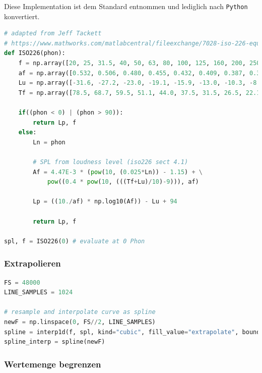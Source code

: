 Diese Implementation ist dem Standard entnommen und lediglich nach
\texttt{Python} konvertiert.

\begin{lstlisting}[language=Python]
# adapted from Jeff Tackett
# https://www.mathworks.com/matlabcentral/fileexchange/7028-iso-226-equal-loudness-level-contour-signal
def ISO226(phon):
    f = np.array([20, 25, 31.5, 40, 50, 63, 80, 100, 125, 160, 200, 250, 315, 400, 500, 630, 800, 1000, 1250, 1600, 2000, 2500, 3150, 4000, 5000, 6300, 8000, 10000, 12500])
    af = np.array([0.532, 0.506, 0.480, 0.455, 0.432, 0.409, 0.387, 0.367, 0.349, 0.330, 0.315, 0.301, 0.288, 0.276, 0.267, 0.259, 0.253, 0.250, 0.246, 0.244, 0.243, 0.243, 0.243, 0.242, 0.242, 0.245, 0.254, 0.271, 0.301])
    Lu = np.array([-31.6, -27.2, -23.0, -19.1, -15.9, -13.0, -10.3, -8.1, -6.2, -4.5, -3.1, -2.0, -1.1, -0.4, 0.0, 0.3, 0.5, 0.0, -2.7, -4.1, -1.0, 1.7, 2.5, 1.2, -2.1, -7.1, -11.2, -10.7, -3.1])
    Tf = np.array([78.5, 68.7, 59.5, 51.1, 44.0, 37.5, 31.5, 26.5, 22.1, 17.9, 14.4, 11.4, 8.6, 6.2, 4.4, 3.0, 2.2, 2.4, 3.5, 1.7, -1.3, -4.2, -6.0, -5.4, -1.5, 6.0, 12.6, 13.9, 12.3])

    if((phon < 0) | (phon > 90)):
        return Lp, f
    else:
        Ln = phon

        # SPL from loudness level (iso226 sect 4.1)
        Af = 4.47E-3 * (pow(10, (0.025*Ln)) - 1.15) + \
            pow((0.4 * pow(10, (((Tf+Lu)/10)-9))), af)

        Lp = ((10./af) * np.log10(Af)) - Lu + 94

        return Lp, f

spl, f = ISO226(0) # evaluate at 0 Phon
\end{lstlisting}

\hypertarget{extrapolieren}{%
\subsubsection{Extrapolieren}\label{extrapolieren}}

\begin{lstlisting}[language=Python]
FS = 48000
LINE_SAMPLES = 1024

# resample and interpolate curve as spline
newF = np.linspace(0, FS//2, LINE_SAMPLES)
spline = interp1d(f, spl, kind="cubic", fill_value="extrapolate", bounds_error=False)
spline_interp = spline(newF)
\end{lstlisting}

\hypertarget{wertemenge-begrenzen}{%
\subsubsection{Wertemenge begrenzen}\label{wertemenge-begrenzen}}

